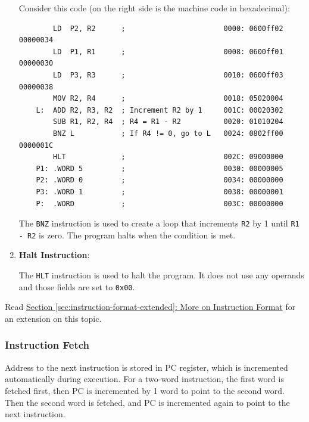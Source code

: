 \begin{enumerate}
\begin{example}
    Consider this code (on the right side is the machine code in hexadecimal):
    \begin{verbatim}
        LD  P2, R2      ;                       0000: 0600ff02 00000034
        LD  P1, R1      ;                       0008: 0600ff01 00000030
        LD  P3, R3      ;                       0010: 0600ff03 00000038
        MOV R2, R4      ;                       0018: 05020004
    L:  ADD R2, R3, R2  ; Increment R2 by 1     001C: 00020302
        SUB R1, R2, R4  ; R4 = R1 - R2          0020: 01010204
        BNZ L           ; If R4 != 0, go to L   0024: 0802ff00 0000001C
        HLT             ;                       002C: 09000000 
    P1: .WORD 5         ;                       0030: 00000005
    P2: .WORD 0         ;                       0034: 00000000
    P3: .WORD 1         ;                       0038: 00000001
    P:  .WORD           ;                       003C: 00000000
    \end{verbatim}
    The \texttt{BNZ} instruction is used to create a loop that increments \texttt{R2} by 1
    until \texttt{R1 - R2} is zero. The program halts when the condition is met.
\end{example}

\item \textbf{Halt Instruction}:

The \texttt{HLT} instruction is used to halt the program. It does not use any operands
and those fields are set to \texttt{0x00}.

\end{enumerate}

\begin{remark}
    Read \hyperref[sec:instruction-format-extended]{Section \ref*{sec:instruction-format-extended}: More on Instruction Format}
    for an extension on this topic.
\end{remark}

\subsubsection{Instruction Fetch}

Address to the next instruction is stored in PC register, which is incremented automatically
during execution. For a two-word instruction, the first word is fetched first, then PC
is incremented by 1 word to point to the second word. Then the second word is fetched,
and PC is incremented again to point to the next instruction.

